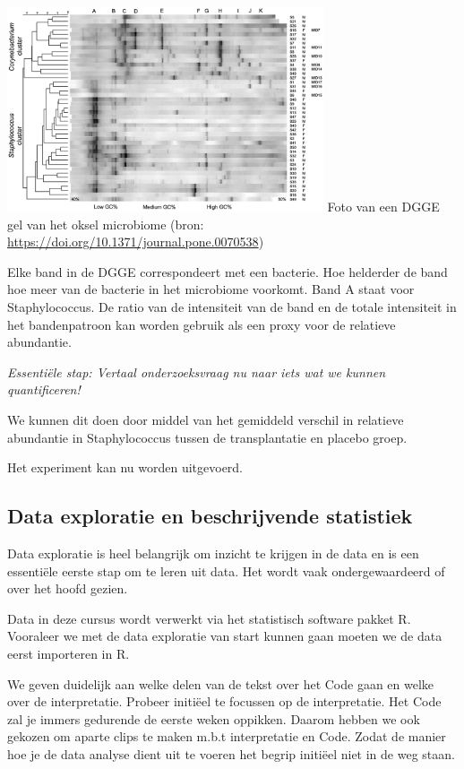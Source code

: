 \documentclass[
  12pt,dutch,coursenotes]{book}
\begin{document}
\includegraphics[width=0.7\textwidth,height=\textheight]{./figures/dgge.png}
Foto van een DGGE gel van het oksel microbiome (bron: \url{https://doi.org/10.1371/journal.pone.0070538})

Elke band in de DGGE correspondeert met een bacterie.
Hoe helderder de band hoe meer van de bacterie in het microbiome voorkomt.
Band A staat voor Staphylococcus.
De ratio van de intensiteit van de band en de totale intensiteit in het bandenpatroon kan worden gebruik als een proxy voor de relatieve abundantie.

\emph{Essentiële stap: Vertaal onderzoeksvraag nu naar iets wat we kunnen quantificeren!}

We kunnen dit doen door middel van het gemiddeld verschil in relatieve abundantie in Staphylococcus tussen de transplantatie en placebo groep.

Het experiment kan nu worden uitgevoerd.

\hypertarget{data-exploratie-en-beschrijvende-statistiek}{%
\subsection{Data exploratie en beschrijvende statistiek}\label{data-exploratie-en-beschrijvende-statistiek}}

Data exploratie is heel belangrijk om inzicht te krijgen in de data en is een essentiële eerste stap om te leren uit data.
Het wordt vaak ondergewaardeerd of over het hoofd gezien.

Data in deze cursus wordt verwerkt via het statistisch software pakket R.
Vooraleer we met de data exploratie van start kunnen gaan moeten we de data eerst importeren in R.

We geven duidelijk aan welke delen van de tekst over het Code gaan en welke over de interpretatie. Probeer initiëel te focussen op de interpretatie. Het Code zal je immers gedurende de eerste weken oppikken. Daarom hebben we ook gekozen om aparte clips te maken m.b.t interpretatie en Code. Zodat de manier hoe je de data analyse dient uit te voeren het begrip initiëel niet in de weg staan.
\end{document}
